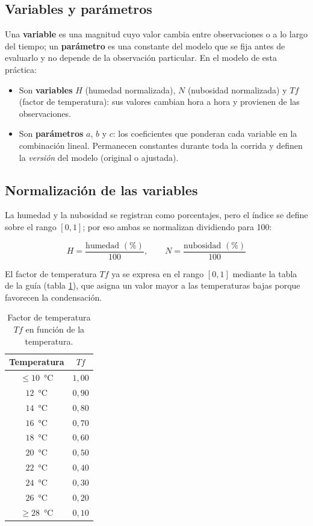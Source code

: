 \documentclass[11pt,a4paper]{article}
\begin{document}
\subsection{Variables y par\'ametros}

Una \textbf{variable} es una magnitud cuyo valor cambia entre observaciones o a lo largo
del tiempo; un \textbf{par\'ametro} es una constante del modelo que se fija antes de
evaluarlo y no depende de la observaci\'on particular. En el modelo de esta pr\'actica:

\begin{itemize}[leftmargin=*]
  \item Son \textbf{variables} $H$ (humedad normalizada), $N$ (nubosidad normalizada) y
        $Tf$ (factor de temperatura): sus valores cambian hora a hora y provienen de las
        observaciones.
  \item Son \textbf{par\'ametros} $a$, $b$ y $c$: los coeficientes que ponderan cada
        variable en la combinaci\'on lineal. Permanecen constantes durante toda la corrida
        y definen la \emph{versi\'on} del modelo (original o ajustada).
\end{itemize}

\subsection{Normalizaci\'on de las variables}

La humedad y la nubosidad se registran como porcentajes, pero el \'indice se define sobre
el rango $[0,1]$; por eso ambas se normalizan dividiendo para 100:

\begin{equation}
H = \frac{\text{humedad }(\%)}{100},
\qquad
N = \frac{\text{nubosidad }(\%)}{100}
\label{eq:normalizacion}
\end{equation}

El factor de temperatura $Tf$ ya se expresa en el rango $[0,1]$ mediante la tabla de la
gu\'ia (tabla \ref{tab:tf}), que asigna un valor mayor a las temperaturas bajas porque
favorecen la condensaci\'on.

\begin{table}[htbp]
\centering
\caption{Factor de temperatura $Tf$ en funci\'on de la temperatura.}
\label{tab:tf}
\small
\begin{tabular}{cc}
\toprule
\textbf{Temperatura} & \textbf{$Tf$} \\
\midrule
$\leq 10$~°C & $1{,}00$ \\
$12$~°C      & $0{,}90$ \\
$14$~°C      & $0{,}80$ \\
$16$~°C      & $0{,}70$ \\
$18$~°C      & $0{,}60$ \\
$20$~°C      & $0{,}50$ \\
$22$~°C      & $0{,}40$ \\
$24$~°C      & $0{,}30$ \\
$26$~°C      & $0{,}20$ \\
$\geq 28$~°C & $0{,}10$ \\
\bottomrule
\end{tabular}
\end{table}
\end{document}
